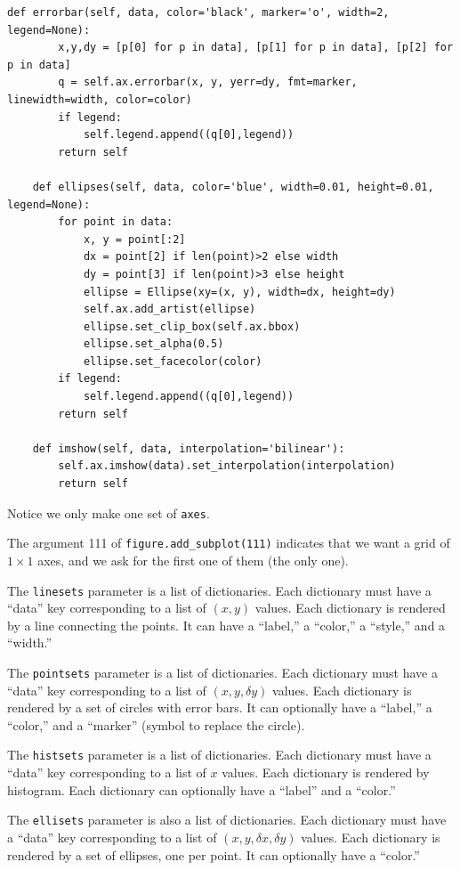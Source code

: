 \documentclass[justified,sixbynine]{tufte-book}
\def\ft{\small\tt}
\theoremstyle{plain}%
\theoremstyle{definition}
\theoremstyle{remark}
\begin{document}
\begin{fullwidth}
\begin{lstlisting}[caption={in file: {\ft nlib.py}}]
    def errorbar(self, data, color='black', marker='o', width=2, legend=None):
        x,y,dy = [p[0] for p in data], [p[1] for p in data], [p[2] for p in data]
        q = self.ax.errorbar(x, y, yerr=dy, fmt=marker, linewidth=width, color=color)
        if legend:
            self.legend.append((q[0],legend))
        return self

    def ellipses(self, data, color='blue', width=0.01, height=0.01, legend=None):
        for point in data:
            x, y = point[:2]
            dx = point[2] if len(point)>2 else width
            dy = point[3] if len(point)>3 else height
            ellipse = Ellipse(xy=(x, y), width=dx, height=dy)
            self.ax.add_artist(ellipse)
            ellipse.set_clip_box(self.ax.bbox)
            ellipse.set_alpha(0.5)
            ellipse.set_facecolor(color)
        if legend:
            self.legend.append((q[0],legend))
        return self

    def imshow(self, data, interpolation='bilinear'):
        self.ax.imshow(data).set_interpolation(interpolation)
        return self
\end{lstlisting}

Notice we only make one set of {\ft axes}.

The argument 111 of {\ft figure.add\_subplot(111)} indicates that we want a grid of $1\times 1$ axes, and we ask for the first one of them (the only one).

The {\ft linesets} parameter is a list of dictionaries. Each dictionary must have a ``data'' key corresponding to a list of $(x,y)$ values. Each dictionary is rendered by a line connecting the points. It can have a ``label,'' a ``color,'' a ``style,'' and a ``width.''

The {\ft pointsets} parameter is a list of dictionaries. Each dictionary must have a ``data'' key corresponding to a list of $(x,y,\delta y)$ values. Each dictionary is rendered by a set of circles with error bars. It can optionally have a ``label,'' a ``color,'' and a ``marker'' (symbol to replace the circle).

The {\ft histsets} parameter is a list of dictionaries. Each dictionary must have a ``data'' key corresponding to a list of $x$ values. Each dictionary is rendered by histogram. Each dictionary can optionally have a ``label'' and a ``color.''

The {\ft ellisets} parameter is also a list of dictionaries. Each dictionary must have a ``data'' key corresponding to a list of $(x,y,\delta x, \delta y)$ values. Each dictionary is rendered by a set of ellipses, one per point. It can optionally have a ``color.''


\end{fullwidth}
\end{document}
